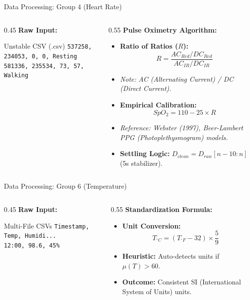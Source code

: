 \documentclass[aspectratio=169]{beamer}
\begin{document}
\begin{frame}{Data Processing: Group 4 (Heart Rate)}
    \begin{columns}
        \begin{column}{0.45\textwidth}
            \textbf{Raw Input:}
            \begin{exampleblock}{Unstable CSV (.csv)}
                \texttt{\small 537258, 234053, 0, 0, Resting}\\
                \texttt{\small 581336, 235534, 73, 57, Walking}
            \end{exampleblock}
        \end{column}
        \begin{column}{0.55\textwidth}
            \textbf{Pulse Oximetry Algorithm:}
            \begin{itemize}
                \item \textbf{Ratio of Ratios ($R$):}
                      \[ R = \frac{AC_{Red} / DC_{Red}}{AC_{IR} / DC_{IR}} \]
                \item \textit{Note: AC (Alternating Current) / DC (Direct Current).}
                \item \textbf{Empirical Calibration:}
                      \[ SpO_2 = 110 - 25 \times R \]
                \item \textit{Reference: Webster (1997), Beer-Lambert PPG (Photoplethysmogram) models.}
                \item \textbf{Settling Logic:} $D_{clean} = D_{raw}[n-10:n]$ (5s stabilizer).
            \end{itemize}
        \end{column}
    \end{columns}
\end{frame}

\begin{frame}{Data Processing: Group 6 (Temperature)}
    \begin{columns}
        \begin{column}{0.45\textwidth}
            \textbf{Raw Input:}
            \begin{exampleblock}{Multi-File CSVs}
                \texttt{\small Timestamp, Temp, Humidi...}\\
                \texttt{\small 12:00, \alert{98.6}, 45\%}
            \end{exampleblock}
        \end{column}
        \begin{column}{0.55\textwidth}
            \textbf{Standardization Formula:}
            \begin{itemize}
                \item \textbf{Unit Conversion:}
                      \[ T_{^\circ C} = (T_{^\circ F} - 32) \times \frac{5}{9} \]
                \item \textbf{Heuristic:} Auto-detects units if $\mu(T) > 60$.
                \item \textbf{Outcome:} Consistent SI (International System of Units) units.
            \end{itemize}
        \end{column}
    \end{columns}
\end{frame}
\end{document}
